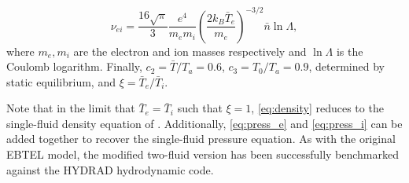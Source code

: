 \documentclass[tighten,apj]{emulateapj}
\begin{document}
		\begin{equation}
			\nu_{ei} = \frac{16\sqrt{\pi}}{3}\frac{e^4}{m_em_i}\left(\frac{2k_B\bar{T}_e}{m_e}\right)^{-3/2}\bar{n}\ln{\Lambda},
			\label{eq:col_freq}
		\end{equation}
		where $m_e,m_i$ are the electron and ion masses respectively and $\ln{\Lambda}$ is the Coulomb logarithm. Finally, $c_2=\bar{T}/T_a=0.6$, $c_3=T_0/T_a=0.9$, determined by static equilibrium, and $\xi=\bar{T}_e/\bar{T}_i$.
		\par Note that in the limit that $\bar{T}_e=\bar{T}_i$ such that $\xi=1$, \autoref{eq:density} reduces to the single-fluid density equation of \citet{cargill_enthalpy-based_2012}. Additionally, \autoref{eq:press_e} and \autoref{eq:press_i} can be added together to recover the single-fluid pressure equation. As with the original EBTEL model, the modified two-fluid version has been successfully benchmarked against the HYDRAD hydrodynamic code.
	
	
	\clearpage
\end{document}
